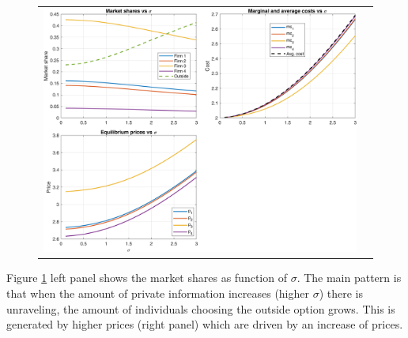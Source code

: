 \documentclass[12pt]{article}
\theoremstyle{plain}
\theoremstyle{plain}
\begin{document}
\begin{figure}[H]
\caption{}
 \label{fig:sigma}
\centering{}%
\begin{tabular}{cc}
\includegraphics[scale=0.61]{figures/simulations/sigma_panels.png} 
\end{tabular}
\end{figure}
Figure \ref{fig:sigma} left panel shows the market shares as function of $\sigma$. The main pattern is that when the amount of private information increases (higher $\sigma$) there is unraveling, the amount of individuals choosing the outside option grows. This is generated by higher prices (right panel) which are driven by an increase of prices. 


  

 
\end{document}
